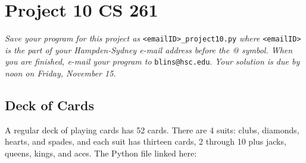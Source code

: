 \documentclass[12pt]{article}
\begin{document}
\section*{Project 10 \hfill CS 261}

\textit{Save your program for this project as} \verb|<emailID>_project10.py| \textit{where} \verb|<emailID>| \textit{is the part of your Hampden-Sydney e-mail address before the @ symbol. When you are finished, e-mail your program to} \verb|blins@hsc.edu|. \textit{Your solution is due by noon on Friday, November 15. }

\subsection*{Deck of Cards}

A regular deck of playing cards has 52 cards.  There are 4 suits: clubs, diamonds, hearts, and spades, and each suit has thirteen cards, 2 through 10 plus jacks, queens, kings, and aces.  The Python file linked here:

%
%
\end{document}
